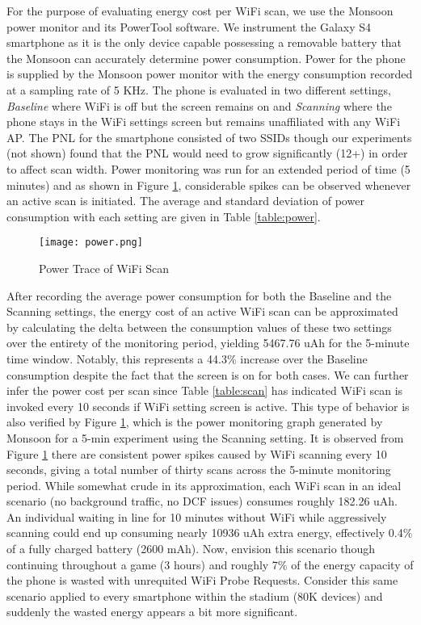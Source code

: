 \documentclass[conference]{IEEEtran}
\begin{document}
For the purpose of evaluating energy cost per WiFi scan, we use the Monsoon power monitor and its PowerTool software.  We instrument the Galaxy S4 smartphone as it is the only device capable possessing a removable battery that the Monsoon can accurately determine power consumption. Power for the phone is supplied by the Monsoon power monitor with the energy consumption recorded at a sampling rate of 5 KHz. The phone is evaluated in two different settings, \emph{Baseline} where WiFi is off but the screen remains on and \emph{Scanning} where the phone stays in the WiFi settings screen but remains unaffiliated with any WiFi AP. The PNL for the smartphone consisted of two SSIDs though our experiments (not shown) found that the PNL would need to grow significantly (12+) in order to affect scan width.  Power monitoring was run for an extended period of time (5 minutes) and as shown in Figure \ref{fig:screenshot}, considerable spikes can be observed whenever an active scan is initiated. The average and standard deviation of power consumption with each setting are given in Table \ref{table:power}. 

\begin{figure}
\centering 
{\texttt{[image: power.png]}}
\caption{Power Trace of WiFi Scan} 
\label{fig:screenshot}
\end{figure} 

After recording the average power consumption for both the Baseline and the Scanning settings, the energy cost of an active WiFi scan can be approximated by calculating the delta between the consumption values of these two settings over the entirety of the monitoring period, yielding 5467.76 uAh for the 5-minute time window.  Notably, this represents a 44.3\% increase over the Baseline consumption despite the fact that the screen is on for both cases. We can further infer the power cost per scan since Table \ref{table:scan} has indicated WiFi scan is invoked every 10 seconds if WiFi setting screen is active. This type of behavior is also verified by Figure \ref{fig:screenshot}, which is the power monitoring graph generated by Monsoon for a 5-min experiment using the Scanning setting. It is observed from Figure \ref{fig:screenshot} there are consistent power spikes caused by WiFi scanning every 10 seconds, giving a total number of thirty scans across the 5-minute monitoring period. While somewhat crude in its approximation, each WiFi scan in an ideal scenario (no background traffic, no DCF issues) consumes roughly 182.26 uAh.  An individual waiting in line for 10 minutes without WiFi while aggressively scanning could end up consuming nearly 10936 uAh extra energy, effectively 0.4\% of a fully charged battery (2600 mAh). Now, envision this scenario though continuing throughout a game (3 hours) and roughly 7\% of the energy capacity of the phone is wasted with unrequited WiFi Probe Requests. Consider this same scenario applied to every smartphone within the stadium (80K devices) and suddenly the wasted energy appears a bit more significant.      
  
\end{document}
